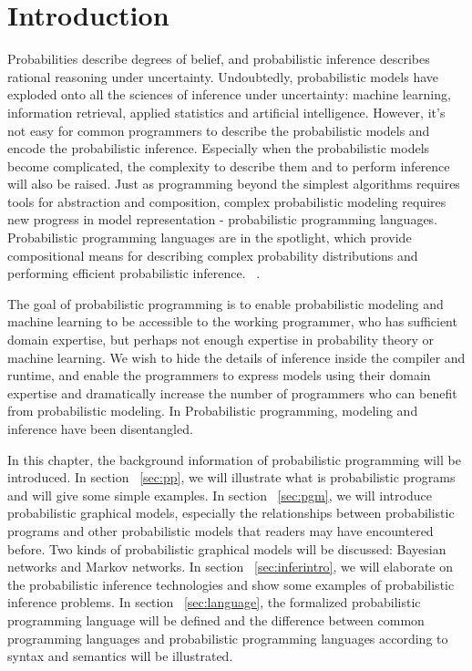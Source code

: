 \chapter{Introduction}
\label{chap:intro}
Probabilities describe degrees of belief, and probabilistic inference describes rational reasoning under uncertainty. Undoubtedly, probabilistic models have exploded onto all the sciences of inference under uncertainty: machine learning, information retrieval, applied statistics and artificial intelligence. However, it's not easy for common programmers to describe the probabilistic models and encode the probabilistic inference. Especially when the probabilistic models become complicated, the complexity to describe them and to perform inference will also be raised. Just as programming beyond the simplest algorithms requires tools for abstraction and composition, complex probabilistic modeling requires new progress in model representation - probabilistic programming languages. Probabilistic programming languages are in the spotlight, which provide compositional means for describing complex probability distributions and performing efficient probabilistic inference. ~\cite{goodman}.

The goal of probabilistic programming is to enable probabilistic modeling and machine learning to be accessible to the working programmer, who has sufficient domain expertise, but perhaps not enough expertise in probability theory or machine learning. We wish to hide the details of inference inside the compiler and runtime, and enable the programmers to express models using their domain expertise and dramatically increase the number of programmers who can benefit from probabilistic modeling. In Probabilistic programming, modeling and inference have been disentangled.

In this chapter, the background information of probabilistic programming will be introduced. In section ~\ref{sec:pp}, we will illustrate what is probabilistic programs and will give some simple examples. In section ~\ref{sec:pgm}, we will introduce probabilistic graphical models, especially the relationships between probabilistic programs and other probabilistic models that readers may have encountered before. Two kinds of probabilistic graphical models will be discussed: Bayesian networks and Markov networks. In section ~\ref{sec:inferintro}, we will elaborate on the probabilistic inference technologies and show some examples of probabilistic inference problems. In section ~\ref{sec:language}, the formalized probabilistic programming language will be defined and the difference between common programming languages and probabilistic programming languages according to syntax and semantics will be illustrated. 

